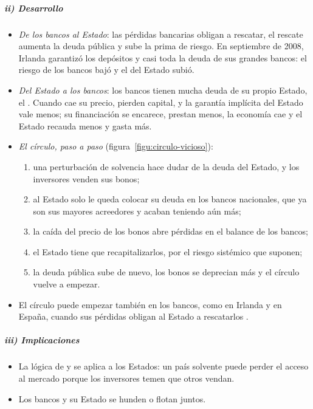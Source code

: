 \documentclass[11pt]{article}
\begin{document}
\subparagraph{ii) Desarrollo}

\begin{itemize}
\item \emph{De los bancos al Estado}: las pérdidas bancarias obligan a rescatar, el rescate aumenta la deuda pública y sube la prima de riesgo. En septiembre de 2008, Irlanda garantizó los depósitos y casi toda la deuda de sus grandes bancos: el riesgo de los bancos bajó y el del Estado subió\nocite{AcharyaDrechslerSchnabl2014}.
\item \emph{Del Estado a los bancos}: los bancos tienen mucha deuda de su propio Estado, el . Cuando cae su precio, pierden capital, y la garantía implícita del Estado vale menos; su financiación se encarece, prestan menos, la economía cae y el Estado recauda menos y gasta más\nocite{BrunnermeierEtAl2016}.
\item \emph{El círculo, paso a paso} (figura~\ref{figu:circulo-vicioso}):
  \begin{enumerate}
  \item una perturbación de solvencia hace dudar de la deuda del Estado, y los inversores venden sus bonos;
  \item al Estado solo le queda colocar su deuda en los bancos nacionales, que ya son sus mayores acreedores y acaban teniendo aún más;
  \item la caída del precio de los bonos abre pérdidas en el balance de los bancos;
  \item el Estado tiene que recapitalizarlos, por el riesgo sistémico que suponen;
  \item la deuda pública sube de nuevo, los bonos se deprecian más y el círculo vuelve a empezar.
  \end{enumerate}
\item El círculo puede empezar también en los bancos, como en Irlanda y en España, cuando sus pérdidas obligan al Estado a rescatarlos .
\end{itemize}

\begin{infografia}[H]
\centering
\caption{El círculo vicioso banca-soberano (\emph{doom loop})}\label{figu:circulo-vicioso}
\end{infografia}

\subparagraph{iii) Implicaciones}

\begin{itemize}
\item La lógica de  y  se aplica a los Estados: un país solvente puede perder el acceso al mercado porque los inversores temen que otros vendan.
\item Los bancos y su Estado se hunden o flotan juntos.
\end{itemize}
\end{document}

